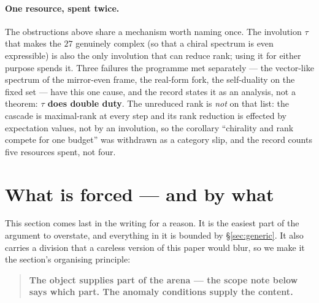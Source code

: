 \documentclass[11pt,a4paper]{article}
\theoremstyle{definition}
\theoremstyle{remark}
\begin{document}
\paragraph{One resource, spent twice.} The obstructions above share a mechanism worth naming once. The involution $\tau$
that makes the $27$ genuinely complex (so that a chiral spectrum is even expressible) is also the only involution that can
reduce rank; using it for either purpose spends it. Three failures the programme met separately --- the vector-like spectrum
of the mirror-even frame, the real-form fork, the self-duality on the fixed set --- have this one cause, and the record states
it as an analysis, not a theorem: \textbf{$\tau$ does double duty}. The unreduced rank is \emph{not} on that list: the
cascade is maximal-rank at every step and its rank reduction is effected by expectation values, not by an involution, so the
corollary ``chirality and rank compete for one budget'' was withdrawn as a category slip, and the record counts five resources
spent, not four.

\section{What is forced --- and by what}\label{sec:forced}

This section comes last in the writing for a reason. It is the easiest part of the argument to
overstate, and everything in it is bounded by \S\ref{sec:generic}. It also carries a division that a
careless version of this paper would blur, so we make it the section's organising principle:

\begin{quote}
\textbf{The object supplies part of the arena --- the scope note below says which part. The anomaly conditions supply
the content.}
\end{quote}
\end{document}
